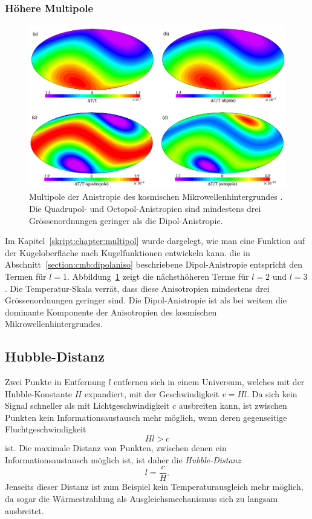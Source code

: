 \subsubsection{Höhere Multipole}
\begin{figure}
\centering
\includegraphics[width=\hsize]{chapters/images/cmb-multipoles.png}
\caption{Multipole der Anistropie des kosmischen Mikrowellenhintergrundes
\cite{cmbmultipoles}.
Die Quadrupol- und Octopol-Anistropien sind mindestens drei Grössenordnungen
geringer als die Dipol-Anistropie.
\label{skript:cmb:multipolaniso}}
\end{figure}
Im Kapitel~\ref{skript:chapter:multipol} wurde dargelegt, wie man eine
Funktion auf der Kugeloberfläche nach Kugelfunktionen entwickeln kann.
die in Abschnitt~\ref{section:cmb:dipolaniso} beschriebene Dipol-Anistropie
entspricht den Termen für $l=1$.
Abbildung~\ref{skript:cmb:multipolaniso} zeigt die nächsthöheren Terme für
$l=2$ und $l=3$ \cite{cmbmultipoles}.
Die Temperatur-Skala verrät, dass diese Anisotropien mindestens drei
Grössenordnungen geringer sind.
Die Dipol-Anistropie ist als bei weitem die dominante Komponente der
Anisotropien des kosmischen Mikrowellenhintergrundes.

\subsection{Hubble-Distanz}
%
Zwei Punkte in Entfernung $l$ entfernen sich in einem Universum, welches
mit der Hubble-Konstante $H$ expandiert, mit der Geschwindigkeit
$v=Hl$.
Da sich kein Signal schneller als mit Lichtgeschwindigkeit $c$ ausbreiten
kann, ist zwischen Punkten kein Informationsaustausch mehr möglich,
wenn deren gegenseitige Fluchtgeschwindigkeit
\[
Hl > c
\]
ist.
Die maximale Distanz von Punkten, zwischen denen ein Informationsaustausch
möglich ist, ist daher die {\em Hubble-Distanz}
\begin{equation}
l = \frac{c}{H}.
\end{equation}
Jenseits dieser Distanz ist zum Beispiel kein Temperaturausgleich mehr
möglich, da sogar die Wärmestrahlung als Ausgleichsmechanismus sich zu
langsam ausbreitet.

